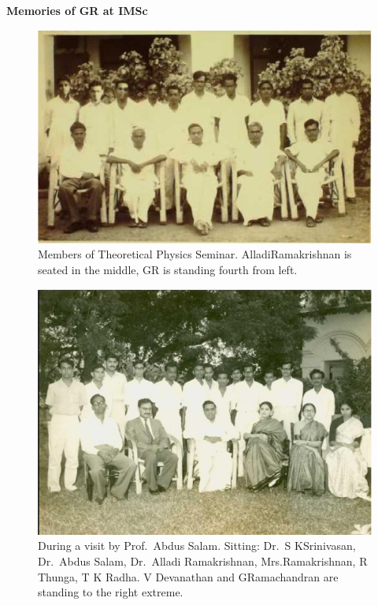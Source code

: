 \eject

\begin{center}
{\bf \Large Memories of GR at IMSc}
\end{center}

\begin{figure}[H]
\centering
\includegraphics[scale=0.33]{src/images/chap25/2.eps}
\caption{Members of Theoretical Physics Seminar. Alladi\break Ramakrishnan is seated
in the middle, GR is standing fourth from left.}
\end{figure}
\medskip

\begin{figure}[H]
\centering
\includegraphics[scale=0.33]{src/images/chap25/3.eps}
\caption{During a visit by Prof.\ Abdus Salam. Sitting: Dr.\ S K\break Srinivasan, Dr.\ Abdus Salam, 
Dr.\ Alladi Ramakrishnan, Mrs.\break Ramakrishnan, R Thunga, T K Radha. 
V Devanathan and G\break Ramachandran are standing to the right extreme.}
\end{figure}

